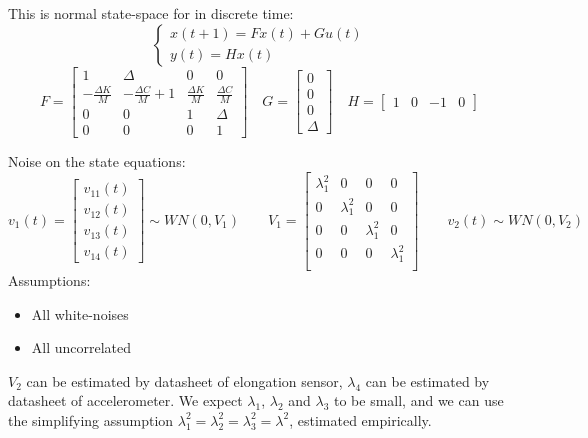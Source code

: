\begin{exercise}
    This is normal state-space for in discrete time:
    \[
        \begin{cases}
            x(t+1) = Fx(t) + Gu(t) \\
            y(t) = Hx(t)
        \end{cases}
    \]
    \[
        F = \begin{bmatrix}
            1 & \Delta & 0 & 0 \\
            -\frac{\Delta K}{M} & -\frac{\Delta C}{M}+1 & \frac{\Delta K}{M} & \frac{\Delta C}{M} \\
            0 & 0 & 1 & \Delta \\
            0 & 0 & 0 & 1
        \end{bmatrix}
        \quad G = \begin{bmatrix}
            0 \\ 0 \\ 0 \\ \Delta
        \end{bmatrix}
        \quad H = \begin{bmatrix}
            1 & 0 & -1 & 0
        \end{bmatrix}
    \]

    Noise on the state equations:
    \[
        v_1(t) = \begin{bmatrix}
            v_{11}(t) \\
            v_{12}(t) \\
            v_{13}(t) \\
            v_{14}(t)
        \end{bmatrix}
        \sim WN(0, V_1)
        \qquad
        V_1 = \begin{bmatrix}
            \lambda_1^2 & 0 & 0 & 0\\
            0 & \lambda_1^2 & 0 & 0 \\
            0 & 0 & \lambda_1^2 & 0 \\
            0 & 0 & 0 & \lambda_1^2 \\
        \end{bmatrix}
        \qquad
        v_2(t) \sim WN(0, V_2)
    \]
    Assumptions:
    \begin{itemize}
        \item All white-noises
        \item All uncorrelated
    \end{itemize}

    $V_2$ can be estimated by datasheet of elongation sensor, $\lambda_4$ can be estimated by datasheet of accelerometer.
    We expect $\lambda_1$, $\lambda_2$ and $\lambda_3$ to be small, and we can use the simplifying assumption $\lambda_1^2=\lambda_2^2=\lambda_3^2 =\lambda^2$, estimated empirically.


\end{exercise}
